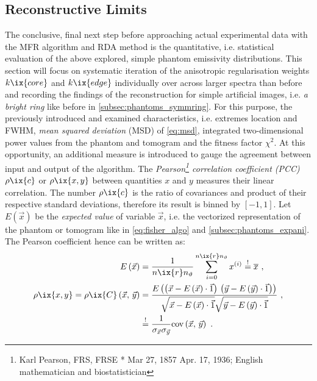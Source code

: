         \subsection{Reconstructive Limits}\label{subsec:limits}%
%
            The conclusive, final next step before approaching actual experimental data with the MFR algorithm and RDA method is the quantitative, i.e. statistical evaluation of the above explored, simple phantom emissivity distributions. This section will focus on systematic iteration of the anisotropic regularisation weights $k\ix{core}$ and $k\ix{edge}$ individually over across larger spectra than before and recording the findings of the reconstruction for simple artificial images, i.e. \textit{a bright ring} like before in \cref{subsec:phantoms_symmring}. For this purpose, the previously introduced and examined characteristics, i.e. extremes location and FWHM, \textit{mean squared deviation} (MSD) of \cref{eq:msd}, integrated two-dimensional power values from the phantom and tomogram and the fitness factor $\chi^{2}$. At this opportunity, an additional measure is introduced to gauge the agreement between input and output of the algorithm. The \textit{Pearson\footnote[1]{Karl Pearson, FRS, FRSE * Mar 27, 1857 \textdagger Apr. 17, 1936; English mathematician and biostatistician} correlation coefficient (PCC)} $\rho\ix{c}$ or $\rho\ix{x,y}$ between quantities $x$ and $y$ measures their linear correlation. The number $\rho\ix{c}$ is the ratio of covariances and product of their respective standard deviations, therefore its result is binned by $\left[-1, 1\right]$. Let $E\left(\vec{x}\right)$ be the \textit{expected value} of variable $\vec{x}$, i.e. the vectorized representation of the phantom or tomogram like in \cref{eq:fisher_algo} and \cref{subsec:phantoms_expani}. The Pearson coefficient hence can be written as:%
%
            \begin{align}%
                \begin{split}\label{eq:pearson}%
                    E\left(\vec{x}\right)&=\frac{1}{n\ix{r}n_{\vartheta}}\displaystyle\sum_{i=0}^{n\ix{r}n_{\vartheta}}x^{\left(i\right)}\overset{!}{=}\overline{x}\,\,,\\%
                    \rho\ix{x,y}=\rho\ix{C}\left(\vec{x},\,\vec{y}\right)&=\frac{E\left(\left(\vec{x}-E\left(\vec{x}\right)\cdot\vec{1}\right)\,\left(\vec{y}-E\left(\vec{y}\right)\cdot\vec{1}\right)\right)}{\sqrt{\vec{x}-E\left(\vec{x}\right)\cdot\vec{1}}\sqrt{\vec{y}-E\left(\vec{y}\right)\cdot\vec{1}}}\,\,,\\
                    &\overset{!}{=}\frac{1}{\sigma_{\vec{x}}\sigma_{\vec{y}}}\text{cov}\left(\vec{x},\,\vec{y}\right)\,\,.%
                \end{split}%
            \end{align}%
%
